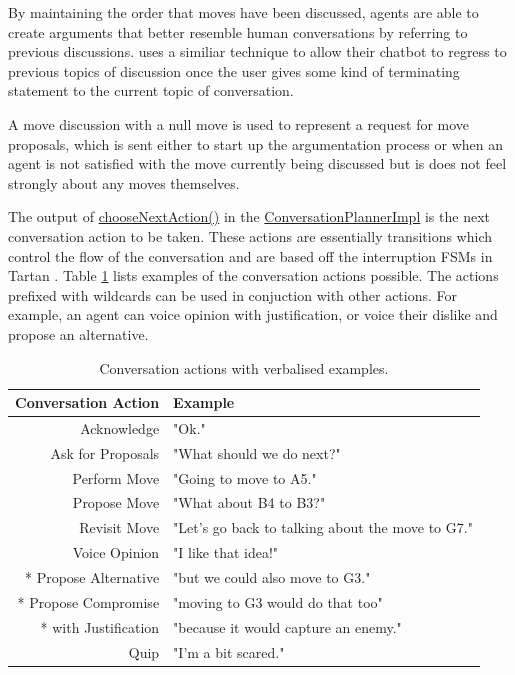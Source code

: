 \documentclass{article}
\begin{document}
By maintaining the order that moves have been discussed, agents are able to create arguments that better resemble human conversations by referring to previous discussions. \cite{tartan} uses a similiar technique to allow their chatbot to regress to previous topics of discussion once the user gives some kind of terminating statement to the current topic of conversation. 

A move discussion with a null move is used to represent a request for move proposals, which is sent either to start up the argumentation process or when an agent is not satisfied with the move currently being discussed but is does not feel strongly about any moves themselves.

The output of \url{chooseNextAction()} in the \url{ConversationPlannerImpl} is the next conversation action to be taken. These actions are essentially transitions which control the flow of the conversation and are based off the interruption FSMs in Tartan \cite{tartan}. Table \ref{tbl:conversationaction} lists examples of the conversation actions possible. The actions prefixed with wildcards can be used in conjuction with other actions. For example, an agent can voice opinion with justification, or voice their dislike and propose an alternative. 


\begin{table} 
\centering
\caption{Conversation actions with verbalised examples.} 
\label{tbl:conversationaction}
\begin{tabular}{ r|l } 
	Conversation Action & Example \\
 \hline
	Acknowledge & "Ok." \\ 
	Ask for Proposals & "What should we do next?" \\ 
	Perform Move & "Going to move to A5." \\ 
	Propose Move & "What about B4 to B3?" \\ 
	Revisit Move & "Let's go back to talking about the move to G7." \\ 
	Voice Opinion & "I like that idea!" \\ 
	* Propose Alternative & "but we could also move to G3." \\ 
	* Propose Compromise & "moving to G3 would do that too"  \\ 
	* with Justification & "because it would capture an enemy."  \\ 
	Quip & "I'm a bit scared."  \\ 
 \hline
\end{tabular}
\end{table}
\end{document}
